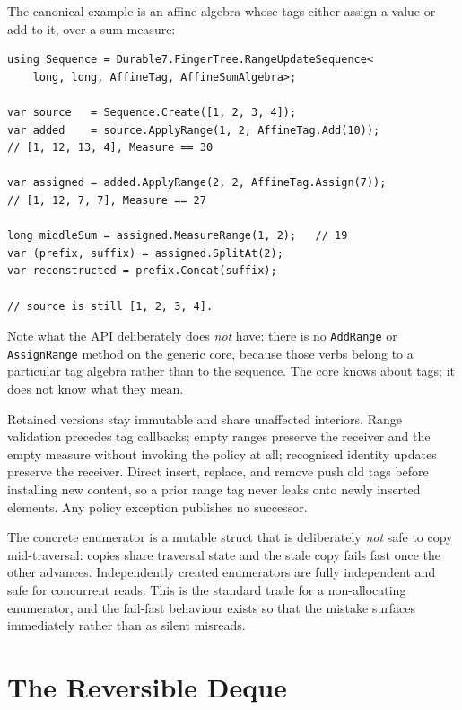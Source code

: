 \documentclass[11pt,twoside,openright]{book}
\newcommand{\code}[1]{\texorpdfstring{\textcolor{d7ink}{\texttt{#1}}}{#1}}
\begin{document}
The canonical example is an affine algebra whose tags either assign a value or
add to it, over a sum measure:

\begin{lstlisting}[language={[Sharp]C}]
using Sequence = Durable7.FingerTree.RangeUpdateSequence<
    long, long, AffineTag, AffineSumAlgebra>;

var source   = Sequence.Create([1, 2, 3, 4]);
var added    = source.ApplyRange(1, 2, AffineTag.Add(10));
// [1, 12, 13, 4], Measure == 30

var assigned = added.ApplyRange(2, 2, AffineTag.Assign(7));
// [1, 12, 7, 7], Measure == 27

long middleSum = assigned.MeasureRange(1, 2);   // 19
var (prefix, suffix) = assigned.SplitAt(2);
var reconstructed = prefix.Concat(suffix);

// source is still [1, 2, 3, 4].
\end{lstlisting}

Note what the API deliberately does \emph{not} have: there is no \code{AddRange}
or \code{AssignRange} method on the generic core, because those verbs belong to
a particular tag algebra rather than to the sequence. The core knows about tags;
it does not know what they mean.

\begin{contractbox}
Retained versions stay immutable and share unaffected interiors. Range
validation precedes tag callbacks; empty ranges preserve the receiver and the
empty measure without invoking the policy at all; recognised identity updates
preserve the receiver. Direct insert, replace, and remove push old tags before
installing new content, so a prior range tag never leaks onto newly inserted
elements. Any policy exception publishes no successor.
\end{contractbox}

\begin{caveatbox}
The concrete enumerator is a mutable struct that is deliberately \emph{not}
safe to copy mid-traversal: copies share traversal state and the stale copy
fails fast once the other advances. Independently created enumerators are fully
independent and safe for concurrent reads. This is the standard trade for a
non-allocating enumerator, and the fail-fast behaviour exists so that the
mistake surfaces immediately rather than as silent misreads.
\end{caveatbox}

\chapter{The Reversible Deque}
\label{ch:revdeque}
\end{document}
